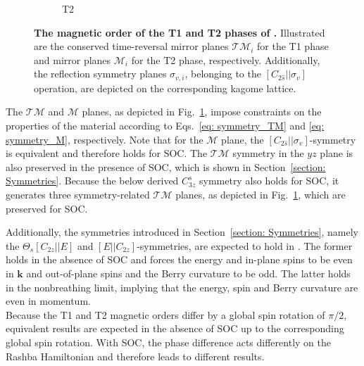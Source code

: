 \begin{figure}[thb]
\begin{subfigure}[c]{0.48\textwidth}
    \caption{T2}
    \end{subfigure}
    \caption{\textbf{The magnetic order of the T1 and T2 phases of .} Illustrated are the conserved time-reversal mirror planes $\mathcal{TM}_i$ for the T1 phase and mirror planes $\mathcal{M}_i$ for the T2 phase, respectively. Additionally, the reflection symmetry planes $\sigma_{v,i}$, belonging to the $[C_{2\hat{s}}||\sigma_v]$ operation, are depicted on the corresponding kagome lattice.}
    \label{fig: magnetic texture Mn3Pt}
\end{figure}
    




The $\mathcal{TM}$ and $\mathcal{M}$ planes, as depicted in Fig.~\ref{fig: magnetic texture Mn3Pt}, impose constraints on the properties of the material according to Eqs.~\eqref{eq: symmetry_TM} and \eqref{eq: symmetry_M}, respectively. Note that for the $\mathcal{M}$ plane, the $[C_{2\hat{s}}||\sigma_v]$-symmetry is equivalent and therefore holds for SOC. 
The $\mathcal{TM}$ symmetry in the $yz$ plane is also preserved in the presence of SOC, which is shown in Section~\ref{section: Symmetries}. 
Because the below derived $C_{3z}^s$ symmetry also holds for SOC, it generates three symmetry-related $\mathcal{TM}$ planes, as depicted in Fig.~\ref{fig: magnetic texture Mn3Pt}, which are preserved for SOC.

Additionally, the symmetries introduced in Section~\ref{section: Symmetries}, namely the $\Theta_s[C_{2z}||E]$ and $[E||C_{2z}]$-symmetries, are expected to hold in . The former holds in the absence of SOC and forces the energy and in-plane spins to be even in $\mathbf{k}$ and out-of-plane spins and the Berry curvature to be odd. The latter holds in the nonbreathing limit, implying that the energy, spin and Berry curvature are even in momentum. \\

Because the T1 and T2 magnetic orders differ by a global spin rotation of $\pi/2$, equivalent results are expected in the absence of SOC up to the corresponding global spin rotation. With SOC, the phase difference acts differently on the Rashba Hamiltonian and therefore leads to different results.\\

